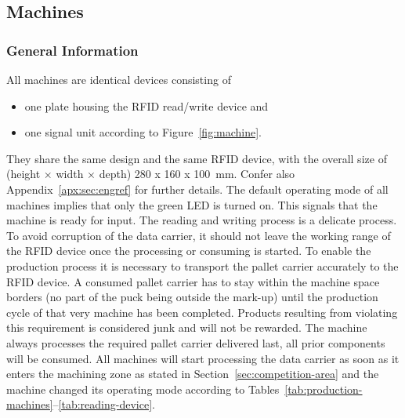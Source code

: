 \documentclass[12pt,twoside]{article}
\begin{document}
\subsection{Machines}
\label{sec:machines}

\subsubsection{General Information}


All machines are identical devices consisting of 
\begin{itemize}
\item one plate housing the RFID read/write device and
\item one signal unit according to Figure~\ref{fig:machine}.
\end{itemize}

They share the same design and the same RFID device, with the overall
size of (height $\times$ width $\times$ depth) \SI{280 x 160 x
  100}{\milli\metre}. Confer also Appendix~\ref{apx:sec:engref} for
  further details. The default operating mode of all machines implies
  that only the green LED is turned on. This signals that the machine
  is ready for input. The reading and writing process is a delicate
  process. To avoid corruption of the data carrier, it should not
  leave the working range of the RFID device once the processing or
  consuming is started. To enable the production process it is
  necessary to transport the pallet carrier accurately to the RFID
  device. A consumed pallet carrier has to stay within the machine
  space borders (no part of the puck being outside the mark-up) until
  the production cycle of that very machine has been
  completed. Products resulting from violating this requirement is
  considered junk and will not be rewarded. The machine always
  processes the required pallet carrier delivered last, all prior
  components will be consumed. All machines will start processing the
  data carrier as soon as it enters the machining zone as stated in
  Section~\ref{sec:competition-area} and the machine changed its
  operating mode according to 
  Tables~\ref{tab:production-machines}--\ref{tab:reading-device}.
\end{document}
